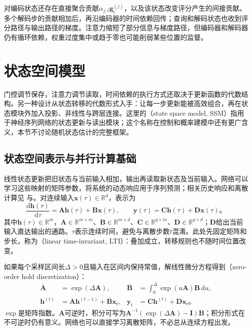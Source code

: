 对编码状态还存在直接聚合贡献$\alpha_{j,t}\bm{g}_{\mathrm{c}}^{(j)}$，以及该状态改变评分产生的间接贡献。多个解码步的贡献相加后，再沿编码器的时间依赖回传；查询和解码状态也收到评分路径与输出路径的梯度。注意力缩短了部分信息与梯度路径，但编码器和解码器仍有循环依赖，权重过度集中或趋于零也可能削弱某些位置的监督。

\section{状态空间模型}
\label{sec:rnn-state-space}

门控调节保存，注意力调节读取，时间依赖的执行方式还取决于更新函数的代数结构。另一种设计从状态转移的代数形式入手：让每一步更新能被高效组合，再在状态模块外加入投影、非线性与跨层连接。这里的（state space model, SSM）指用于神经序列网络的状态更新与读出模块；这个名称在控制和概率建模中还有更广含义，本节不讨论随机状态估计的完整框架。

\subsection{状态空间表示与并行计算基础}
\label{sec:rnn-ssm-foundations}

线性状态更新把旧状态与当前输入相加，输出再读取新状态及当前输入。网络可以学习这些映射的矩阵参数，将系统的动态响应用于序列预测；相关历史响应和离散计算见
与。对连续输入$\bm{x}(\tau)\in\mathbb{R}^{d}$，表示为
\begin{equation}
  \frac{\mathrm{d}\bm{h}(\tau)}{\mathrm{d}\tau}
    =\bm{A}\bm{h}(\tau)+\bm{B}\bm{x}(\tau),
  \qquad
  \bm{y}(\tau)=\bm{C}\bm{h}(\tau)+\bm{D}\bm{x}(\tau)\text{。}
  \label{eq:rnn-continuous-ssm}
\end{equation}
其中$\bm{h}(\tau)\in\mathbb{R}^{m}$，$\bm{A}\in\mathbb{R}^{m\times m}$、$\bm{B}\in\mathbb{R}^{m\times d}$、$\bm{C}\in\mathbb{R}^{q\times m}$、$\bm{D}\in\mathbb{R}^{q\times d}$；$\bm{D}$给出当前输入直达输出的通路。$\tau$表示连续时间，避免与离散步数$t$混淆。此处先固定矩阵和步长，称为（linear time-invariant, LTI）：叠加成立，转移规则也不随时间位置改变。

如果每个采样区间长$\Delta>0$且输入在区间内保持常值，解线性微分方程得到（zero-order hold discretization）：
\begin{equation}
  \begin{aligned}
    \overline{\bm{A}}&=\exp(\Delta\bm{A}),
    &\overline{\bm{B}}&=\int_0^{\Delta}\exp(u\bm{A})\bm{B}\,\mathrm{d}u,\\
    \bm{h}^{(t)}&=\overline{\bm{A}}\bm{h}^{(t-1)}
       +\overline{\bm{B}}\bm{x}_t,
    &\bm{y}_t&=\bm{C}\bm{h}^{(t)}+\bm{D}\bm{x}_t\text{。}
  \end{aligned}
  \label{eq:rnn-ssm-zoh}
\end{equation}
$\exp$是矩阵指数。$\bm{A}$可逆时，积分可写为$\bm{A}^{-1}(\exp(\Delta\bm{A})-\bm{I})\bm{B}$；积分形式在不可逆时仍有意义。网络也可以直接学习离散矩阵，不必总从连续方程出发。

